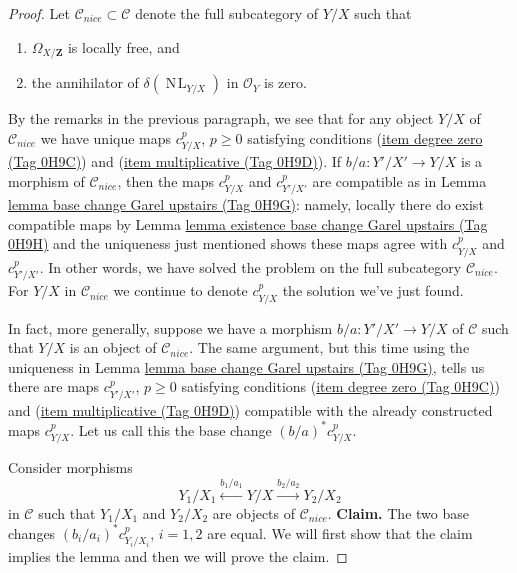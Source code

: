 \documentclass{amsart}
\theoremstyle{plain}
\theoremstyle{definition}
\theoremstyle{remark}
\numberwithin{equation}{subsection}
\def\NL{\mathop{N\!L}\nolimits}
\begin{document}
\begin{proof}
\medskip\noindent
Let $\mathcal{C}_{nice} \subset \mathcal{C}$ denote the full subcategory
of $Y/X$ such that
\begin{enumerate}
\item $\Omega_{X/\mathbf{Z}}$ is locally free, and
\item the annihilator of $\delta(\NL_{Y/X})$ in $\mathcal{O}_Y$ is zero.
\end{enumerate}
By the remarks in the previous paragraph, we see that for any
object $Y/X$ of $\mathcal{C}_{nice}$ we have unique maps
$c^p_{Y/X}$, $p \geq 0$ satisfying conditions (\href{https://stacks.math.columbia.edu/tag/0H9C}{item degree zero (Tag 0H9C)})
and (\href{https://stacks.math.columbia.edu/tag/0H9D}{item multiplicative (Tag 0H9D)}). If $b/a : Y'/X' \to Y/X$
is a morphism of $\mathcal{C}_{nice}$, then the maps
$c^p_{Y/X}$ and $c^p_{Y'/X'}$ are compatible as in
Lemma \href{https://stacks.math.columbia.edu/tag/0H9G}{lemma base change Garel upstairs (Tag 0H9G)}: namely,
locally there do exist compatible maps by
Lemma \href{https://stacks.math.columbia.edu/tag/0H9H}{lemma existence base change Garel upstairs (Tag 0H9H)}
and the uniqueness just mentioned shows these maps agree
with $c^p_{Y/X}$ and $c^p_{Y'/X'}$.
In other words, we have solved the problem
on the full subcategory $\mathcal{C}_{nice}$. For $Y/X$ in $\mathcal{C}_{nice}$
we continue to denote $c^p_{Y/X}$ the solution we've just found.

\medskip\noindent
In fact, more generally, suppose we have a morphism $b/a : Y'/X' \to Y/X$
of $\mathcal{C}$ such that $Y/X$ is an object of $\mathcal{C}_{nice}$.
The same argument, but this time using the uniqueness in
Lemma \href{https://stacks.math.columbia.edu/tag/0H9G}{lemma base change Garel upstairs (Tag 0H9G)}, tells us there are
maps $c^p_{Y'/X'}$, $p \geq 0$  satisfying conditions (\href{https://stacks.math.columbia.edu/tag/0H9C}{item degree zero (Tag 0H9C)})
and (\href{https://stacks.math.columbia.edu/tag/0H9D}{item multiplicative (Tag 0H9D)}) compatible with the already constructed
maps $c^p_{Y/X}$. Let us call this the base change
$(b/a)^*c^p_{Y/X}$.

\medskip\noindent
Consider morphisms
$$
Y_1/X_1 \xleftarrow{b_1/a_1} Y/X \xrightarrow{b_2/a_2} Y_2/X_2
$$
in $\mathcal{C}$ such that $Y_1/X_1$ and $Y_2/X_2$ are objects
of $\mathcal{C}_{nice}$.
{\bf Claim.} The two base changes $(b_i/a_i)^*c^p_{Y_i/X_i}$, $i = 1, 2$
are equal. We will first show that the claim implies the lemma
and then we will prove the claim.


\end{proof}
\end{document}
